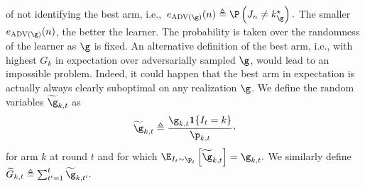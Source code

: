     of not identifying the best 
    arm, i.e.,~$\ProErr_{\advPro(\gainVector)}(\timeHorizon)
     \triangleq \Pro\left(\recomArm_{\timeHorizon} \neq \bestArm_{\gainVector}\right).$
     The smaller $\ProErr_{\advPro(\gainVector)}(\timeHorizon)$, 
    the better the learner. The probability 
    is taken over the randomness of the learner as $\gainVector$ is fixed.
    An alternative definition of  the best arm, i.e., with
     highest $G_{k}$ in expectation over adversarially 
     sampled $\gainVector$, would lead to an impossible problem. 
     Indeed, it could happen that the best arm in expectation is actually 
     always clearly suboptimal on any realization $\gainVector$.
%
%
%
%
%
We define the random variables $\estGainVector_{k,t}$ as
\begin{equation*}
\estGainVector_{k,t} 
\triangleq
 \frac{\gainVector_{k,t}\indicator{\pulledArm_t = k}}
 {\learnerDist_{k,t}}\CommaBin
\end{equation*}
%
for 
arm $k$ at round $t$ and for which  $\Exp_{\pulledArm_t\sim\learnerDist_{t}}
\left[\estGainVector_{k,t}\right]=\gainVector_{k,t}.$
We similarly define $\estCumulGainVector_{k,t} \triangleq \sum_{t'=1}^{t} \estGainVector_{k,t'}.
$
%
